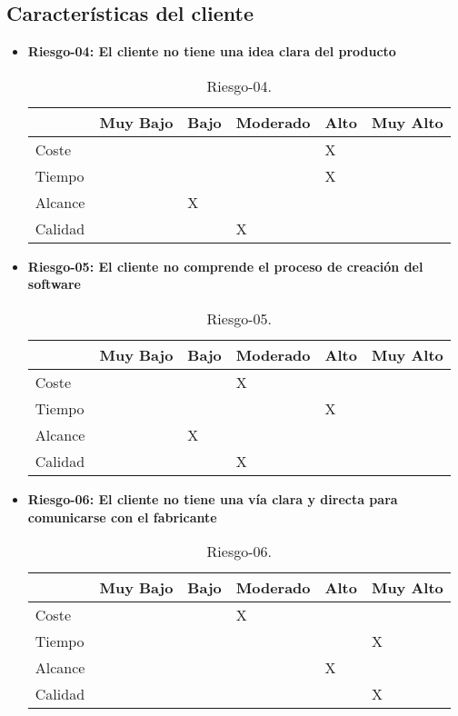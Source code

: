 \subsection{Características del cliente}
\begin{itemize}
	\item \textbf{Riesgo-04: El cliente no tiene una idea clara del producto}
	\begin{table}[H]
	\begin{center}
	\begin{tabular}{ l l l l l l }
	\hline
	& Muy Bajo & Bajo & Moderado & Alto & Muy Alto \\ \hline \hline
	Coste &  &  &  & X &  \\ \hline
	Tiempo &  &  &  & X &  \\ \hline
	Alcance &  & X &  &  &  \\ \hline
	Calidad &  &  & X &  &  \\ \hline
	\end{tabular}
	\caption{Riesgo-04.}
	\label{Riesgo-04}
	\end{center}
	\end{table}
	\item \textbf{Riesgo-05: El cliente no comprende el proceso de creación del software}
	\begin{table}[H]
	\begin{center}
	\begin{tabular}{ l l l l l l }
	\hline
	& Muy Bajo & Bajo & Moderado & Alto & Muy Alto \\ \hline \hline
	Coste &  &  & X &  &  \\ \hline
	Tiempo &  &  &  & X &  \\ \hline
	Alcance &  & X &  &  &  \\ \hline
	Calidad &  &  & X &  &  \\ \hline
	\end{tabular}
	\caption{Riesgo-05.}
	\label{Riesgo-05}
	\end{center}
	\end{table}
	\item \textbf{Riesgo-06: El cliente no tiene una vía clara y directa para comunicarse con el fabricante}
	\begin{table}[H]
	\begin{center}
	\begin{tabular}{ l l l l l l }
	\hline
	& Muy Bajo & Bajo & Moderado & Alto & Muy Alto \\ \hline \hline
	Coste &  &  & X &  &  \\ \hline
	Tiempo &  &  &  & & X  \\ \hline
	Alcance &  & & & X  &  \\ \hline
	Calidad &  &  & & & X  \\ \hline
	\end{tabular}
	\caption{Riesgo-06.}
	\label{Riesgo-06}
	\end{center}
	\end{table}
\end{itemize}

